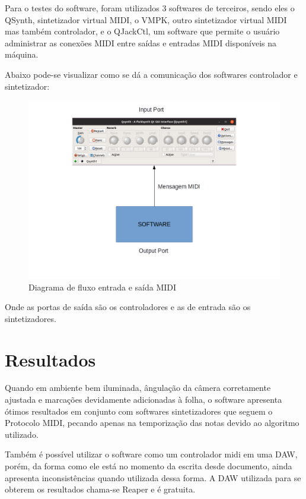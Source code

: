 \documentclass[12pt]{report}
\begin{document}
Para o testes do software, foram utilizados 3 softwares de terceiros, sendo eles o QSynth, sintetizador virtual MIDI, o VMPK, outro sintetizador virtual MIDI mas também controlador, e o QJackCtl, um software que permite o usuário administrar as conexões MIDI entre saídas e entradas MIDI disponíveis na máquina.

Abaixo pode-se visualizar como se dá a comunicação dos softwares controlador e sintetizador:

\begin{figure}[H]
  \centering
    \includegraphics[width=1\textwidth]{imagens/Diagrama2.png}
    \caption{Diagrama de fluxo entrada e saída MIDI}
    \label{fig:diagrama}
\end{figure}

Onde as portas de saída são os controladores e as de entrada são os sintetizadores.

\chapter{Resultados}
\label{cha:resultados}

Quando em ambiente bem iluminada, ângulação da câmera corretamente ajustada e marcações devidamente adicionadas à folha, o software apresenta ótimos resultados em conjunto com softwares sintetizadores que seguem o Protocolo MIDI, pecando apenas na temporização das notas devido ao algoritmo utilizado.

Também é possível utilizar o software como um controlador midi em uma DAW, porém, da forma como ele está no momento da escrita desde documento, ainda apresenta inconsistências quando utilizada dessa forma. A DAW utilizada para se obterem os resultados chama-se Reaper e é gratuita.
\end{document}
